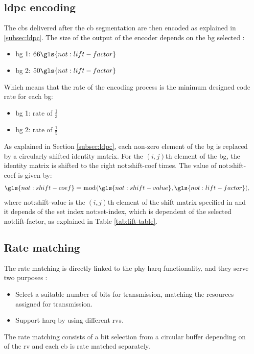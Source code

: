 
\subsection{\gls{ldpc} encoding}

The \glspl{cb} delivered after the \gls{cb} segmentation are then encoded as explained in \ref{subsec:ldpc}.
%
The size of the output of the encoder depends on the \gls{bg} selected \cite{3gpp.38.212}:
%
\begin{itemize}
    \item \gls{bg} 1: $66 \gls{not:lift-factor}$
    \item \gls{bg} 2: $50 \gls{not:lift-factor}$
\end{itemize}
%
Which means that the rate of the encoding process is the minimum designed code rate for each \gls{bg}:
%
\begin{itemize}
    \item \gls{bg} 1: rate of $\frac{1}{3}$
    \item \gls{bg} 2: rate of $\frac{1}{5}$
\end{itemize}

As explained in Section \ref{subsec:ldpc}, each non-zero element of the \gls{bg} is replaced by a circularly shifted identity matrix.
%
For the $(i,j)$th element of the \gls{bg}, the identity matrix is shifted to the right \gls{not:shift-coef} times.
%
The value of \gls{not:shift-coef} is given by:
%
\begin{equation}
    \gls{not:shift-coef} = \bmod (\gls{not:shift-value}, \gls{not:lift-factor}) ,
\end{equation}
%
\noindent where \gls{not:shift-value} is the $(i,j)$th element of the shift matrix specified in \cite[Tables 5.3.2-2 and 5.3.2-3]{3gpp.38.212} and it depends of the set index \gls{not:set-index}, which is dependent of the selected \gls{not:lift-factor}, as explained in Table \ref{tab:lift-table}.



\subsection{Rate matching}

The rate matching is directly linked to the \gls{phy} \gls{harq} functionality, and they serve two purposes \cite{ErikDahlman5G}:
%
\begin{itemize}
    \item Select a suitable number of bits for transmission, matching the resources assigned for transmission.
    \item Support \gls{harq} by using different \glspl{rv}.
\end{itemize}
%
The rate matching consists of a bit selection from a circular buffer depending on of the \gls{rv} and each \gls{cb} is rate matched separately.

